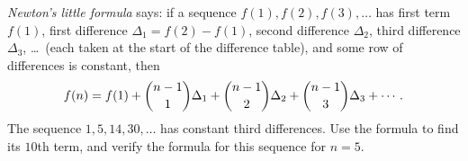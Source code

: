 \emph{Newton's little formula} says: if a sequence $f(1),f(2),f(3),\dots$ has first term $f(1)$, first difference $\Delta_1=f(2)-f(1)$, second difference $\Delta_2$, third difference $\Delta_3$, \dots\ (each taken at the start of the difference table), and some row of differences is constant, then
\[
f(n)=f(1)+\dbinom{n-1}{1}\Delta_1+\dbinom{n-1}{2}\Delta_2+\dbinom{n-1}{3}\Delta_3+\cdots .
\]
The sequence $1,5,14,30,\dots$ has constant third differences. Use the formula to find its $10$th term, and verify the formula for this sequence for $n=5$.
